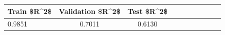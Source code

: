 \begin{tabular}{lccccccccc}
\toprule
Train \$R\textasciicircum 2\$ & Validation \$R\textasciicircum 2\$ & Test \$R\textasciicircum 2\$ \\
\midrule
0.9851 & 0.7011 & 0.6130 \\
\bottomrule
\end{tabular}
